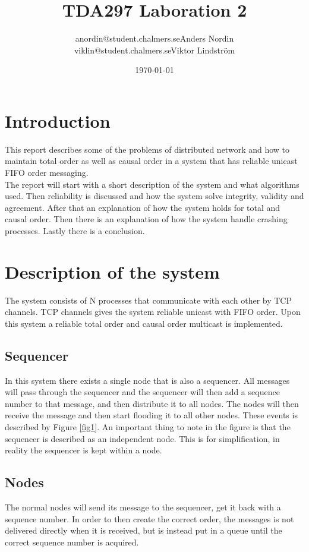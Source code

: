\documentclass{article}
\title{TDA297 Laboration 2}
\author{anordin@student.chalmers.se\quad Anders Nordin\\
        viklin@student.chalmers.se\quad Viktor Lindstr\"{o}m}
\date{\today}
\begin{document}
\maketitle
\newpage

\section{Introduction}
  This report describes some of the problems of distributed network and how to maintain total order 
  as well as causal order in a system that has reliable unicast FIFO order messaging.\\
  The report will start with a short description of the system and what algorithms used. 
  Then reliability is discussed and how the system solve integrity, validity and agreement.
  After that an explanation of how the system holds for total and causal order. Then there 
  is an explanation of how the system handle crashing processes. Lastly there is a conclusion.

\section{Description of the system}
 The system consists of N processes that communicate with each other by TCP channels.
 TCP channels gives the system reliable unicast with FIFO order. Upon this system a
 reliable total order and causal order multicast is implemented. 
 \subsection{Sequencer}
 In this system there exists a single node that is also a sequencer. All messages will 
 pass through the sequencer and the sequencer will then add a sequence number to that 
 message, and then distribute it to all nodes. The nodes will then receive the message 
 and then start flooding it to all other nodes. These events is described by Figure 
 \ref{fig1}. An important thing to note in the figure is that the sequencer is described 
 as an independent node. This is for simplification, in reality the sequencer is kept 
 within a node. \\
 \subsection{Nodes}
 The normal nodes will send its message to the sequencer, get it back with a sequence number.
 In order to then create the correct order, the messages is not delivered directly when
 it is received, but is instead put in a queue until the correct sequence number is acquired.\\
\end{document}
